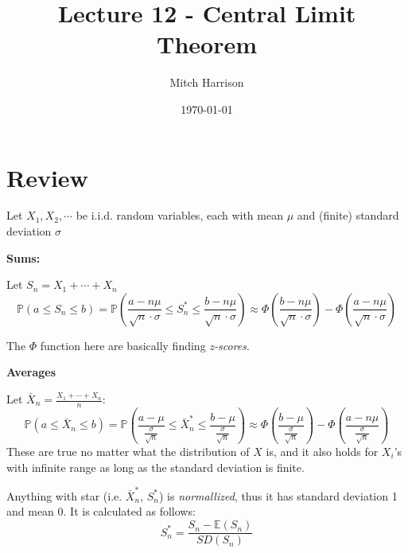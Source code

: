 \documentclass[titlepage, 12pt, leqno]{article}
\title{\Huge{Lecture 12 - Central Limit Theorem}}
\author{\large{Mitch Harrison}}
\date{\today}
\begin{document}
\setlength{\parskip}{1\baselineskip}
\setlength{\parindent}{15pt}
\maketitle
\tableofcontents
\newpage


\section{Review}

\begin{ex}
    Let $X_1, X_2, \cdots $ be i.i.d. random variables, each with mean $\mu$ and
    (finite) standard deviation $\sigma$
    \vspace{10px}

    \textbf{Sums:}

    Let $S_n = X_1 + \cdots + X_n$
    \[
    \mathbb{P}(a \le S_n \le b) = \mathbb{P}\left(
        \frac{a - n\mu}{\sqrt{n}\cdot\sigma} \le S_n^* \le
        \frac{b - n\mu}{\sqrt{n}\cdot\sigma}\right)
        \approx \Phi\left(\frac{b-n\mu}{\sqrt{n}\cdot\sigma}\right) -  
        \Phi\left(\frac{a-n\mu}{\sqrt{n}\cdot\sigma}\right)
    \]
    \begin{note}
        The $\Phi$ function here are basically finding \textit{z-scores}.
    \end{note}
    
    \textbf{Averages}

    Let $\bar X_n = \frac{X_1 + \cdots + X_n}{n}$:
    \[
    \mathbb{P}(a \le \bar X_n \le b) = \mathbb{P}\left(
        \frac{a - \mu}{\frac{\sigma}{\sqrt{n}}}\le \bar X_n^* \le
        \frac{b - \mu}{\frac{\sigma}{\sqrt{n}}}\right)
        \approx \Phi\left(\frac{b-\mu}{\frac{\sigma}{\sqrt{n}}}\right) -  
        \Phi\left(\frac{a-n\mu}{\frac{\sigma}{\sqrt{n}}}\right)
    \]
    These are true no matter what the distribution of $X$ is, and it also holds
    for $X_i$'s with infinite range as long as the standard deviation is finite.
\end{ex}

\begin{note}
    Anything with star (i.e. $\bar X_n^*$, $S_n^*$) is \textit{normallized}, thus
    it has standard deviation 1 and mean 0. It is calculated as follows:
    \[
    S^*_n = \frac{S_n - \mathbb{E}(S_n)}{SD(S_n)}
    \]
\end{note}
\end{document}
